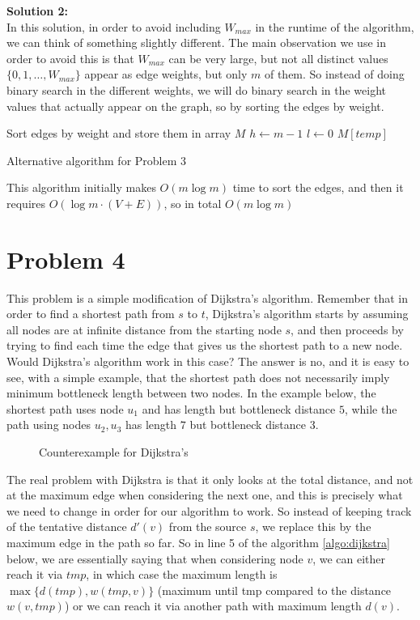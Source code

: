 \documentclass{article}
\begin{document}
\begin{enumerate}
\textbf{Solution 2:}\\
In this solution, in order to avoid including $W_{max}$ in the runtime of the
algorithm, we can think of something slightly different. The main observation
we use in order to avoid this is that $W_{max}$ can be very large, but not all
distinct values $\{0, 1,\dots, W_{max}\}$ appear as edge weights, but only $m$
of them. So instead of doing binary search in the different weights, we will do
binary search in the weight values that actually appear on the graph, so by
sorting the edges by weight.

\begin{algorithm}
Sort edges by weight and store them in array $M$\;
$h\leftarrow m-1$\;
$l\leftarrow 0$\;
\Return $M[temp]$\;
\caption{Alternative algorithm for Problem 3}
\end{algorithm}

This algorithm initially makes $O(m\log m)$ time to sort the edges, and then it
requires $O(\log m \cdot (V+E))$, so in total $O(m\log m)$

	\end{enumerate}

\section*{Problem 4}
This problem is a simple modification of Dijkstra's algorithm. Remember that in
order to find a shortest path from $s$ to $t$, Dijkstra's algorithm starts by
assuming all nodes are at infinite distance from the starting node $s$, and
then proceeds by trying to find each time the edge that gives us the shortest
path to a new node. Would Dijkstra's algorithm work in this case? The answer is
no, and it is easy to see, with a simple example, that the shortest path does
not necessarily imply minimum bottleneck length between two nodes. In the
example below, the shortest path uses node $u_1$ and has length but bottleneck
distance $5$, while the path using nodes $u_2, u_3$ has length $7$ but
bottleneck distance 3.

\begin{figure}[H]
\centering

	\caption{Counterexample for Dijkstra's}
	\label{fig:counterexample}
	\end{figure}

The real problem with Dijkstra is that it only looks at the total distance, and
not at the maximum edge when considering the next one, and this is precisely
what we need to change in order for our algorithm to work. So instead of
keeping track of the tentative distance $d'(v)$ from the source $s$, we replace
this by the maximum edge in the path so far. So in line 5 of the algorithm
\ref{algo:dijkstra} below, we are essentially saying that when considering node
$v$, we can either reach it via $tmp$, in which case the maximum length is
$\max \{d(tmp), w(tmp,v)\}$ (maximum until tmp compared to the distance $w(v,
tmp)$) or we can reach it via another path with maximum length $d(v)$.
\end{document}
